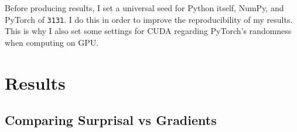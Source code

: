 \documentclass{IEEEtran}
\begin{document}
Before producing results, I set a universal seed for Python itself, NumPy, and PyTorch of \texttt{3131}.
I do this in order to improve the reproducibility of my results.
This is why I also set some settings for CUDA regarding PyTorch's randomness when computing on GPU.

\section{Results}


\subsection{Comparing Surprisal vs Gradients}
\end{document}
